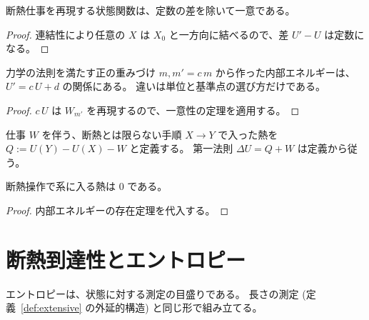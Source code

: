 \begin{theorem}[内部エネルギーの一意性]
  \label{thm:internal-energy-unique}
  \leanok
  断熱仕事を再現する状態関数は、定数の差を除いて一意である。
\end{theorem}

\begin{proof}
  \leanok
  連結性により任意の $X$ は $X_0$ と一方向に結べるので、差 $U' - U$ は定数になる。
\end{proof}

\begin{theorem}[内部エネルギーも重みづけの選び方によらない]
  \label{thm:energy-compatible}
  \leanok
  力学の法則を満たす正の重みづけ $m, m' = c\, m$ から作った内部エネルギーは、$U' = c\, U + d$ の関係にある。
  違いは単位と基準点の選び方だけである。
\end{theorem}

\begin{proof}
  \leanok
  $c\, U$ は $W_{m'}$ を再現するので、一意性の定理を適用する。
\end{proof}

\begin{definition}[熱]
  \label{def:heat}
  \leanok
  仕事 $W$ を伴う、断熱とは限らない手順 $X \to Y$ で入った熱を $Q := U(Y) - U(X) - W$ と定義する。
  第一法則 $\Delta U = Q + W$ は定義から従う。
\end{definition}

\begin{theorem}[断熱操作の熱]
  \label{thm:heat-adiabatic}
  \leanok
  断熱操作で系に入る熱は $0$ である。
\end{theorem}

\begin{proof}
  \leanok
  内部エネルギーの存在定理を代入する。
\end{proof}

\chapter{断熱到達性とエントロピー}

エントロピーは、状態に対する測定の目盛りである。
長さの測定 (定義~\ref{def:extensive} の外延的構造) と同じ形で組み立てる。

